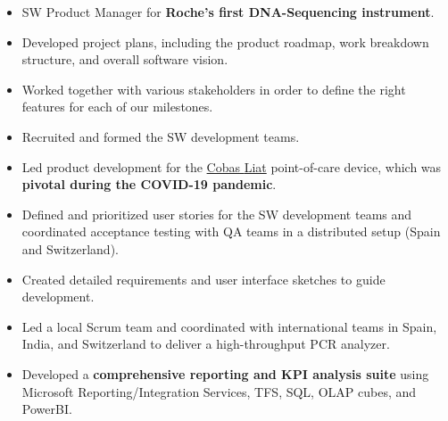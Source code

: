 \documentclass[10pt,a4paper]{altacv}
\begin{document}
\medskip


\begin{itemize}
	\item SW Product Manager for \textbf{Roche's first DNA-Sequencing instrument}.
	\item Developed project plans, including the product roadmap, work breakdown structure, and overall software vision. 
	\item Worked together with various stakeholders in order to define the right features for each of our milestones.
	\item Recruited and formed the SW development teams.
\end{itemize}


\begin{itemize}
	\item Led product development for the {\href{https://www.cobasliat.com/}{\textsuperscript{\textregistered}Cobas \textsuperscript{\textregistered}Liat}} point-of-care device, which was \textbf{pivotal during the COVID-19 pandemic}.
	\item Defined and prioritized user stories for the SW development teams and coordinated acceptance testing with QA teams in a distributed setup (Spain and Switzerland).
	\item Created detailed requirements and user interface sketches to guide development.
\end{itemize}

\begin{itemize}
	\item Led a local Scrum team and coordinated with international teams in Spain, India, and Switzerland to deliver a high-throughput PCR analyzer.
	\item Developed a \textbf{comprehensive reporting and KPI analysis suite} using Microsoft Reporting/Integration Services, TFS, SQL, OLAP cubes, and PowerBI.
\end{itemize}
\end{document}
